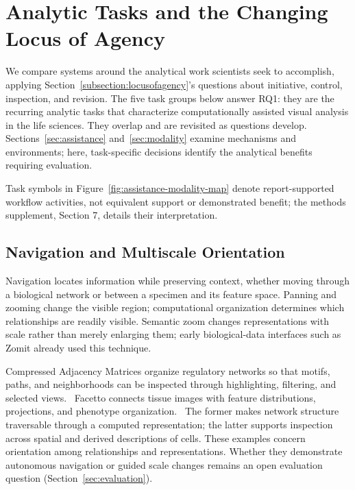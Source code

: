 \section{Analytic Tasks and the Changing Locus of Agency}
\label{sec:tasks}

We compare systems around the analytical work scientists seek to accomplish, applying Section~\ref{subsection:locusofagency}'s questions about initiative, control, inspection, and revision. The five task groups below answer RQ1: they are the recurring analytic tasks that characterize computationally assisted visual analysis in the life sciences. They overlap and are revisited as questions develop. Sections~\ref{sec:assistance} and~\ref{sec:modality} examine mechanisms and environments; here, task-specific decisions identify the analytical benefits requiring evaluation.

Task symbols in Figure~\ref{fig:assistance-modality-map} denote report-supported workflow activities, not equivalent support or demonstrated benefit; the methods supplement, Section 7, details their interpretation.

\subsection{Navigation and Multiscale Orientation}
\label{sec:tasks-navigation}

Navigation locates information while preserving context, whether moving through a biological network or between a specimen and its feature space. Panning and zooming change the visible region; computational organization determines which relationships are readily visible. Semantic zoom changes representations with scale rather than merely enlarging them; early biological-data interfaces such as Zomit already used this technique.~\cite{Cockburn2009OverviewDetail,Pook1998Zomit}

Compressed Adjacency Matrices organize regulatory networks so that motifs, paths, and neighborhoods can be inspected through highlighting, filtering, and selected views.~\cite{AnchorCompressedMatrices} Facetto connects tissue images with feature distributions, projections, and phenotype organization.~\cite{AnchorFacetto} The former makes network structure traversable through a computed representation; the latter supports inspection across spatial and derived descriptions of cells. These examples concern orientation among relationships and representations. Whether they demonstrate autonomous navigation or guided scale changes remains an open evaluation question (Section~\ref{sec:evaluation}).

